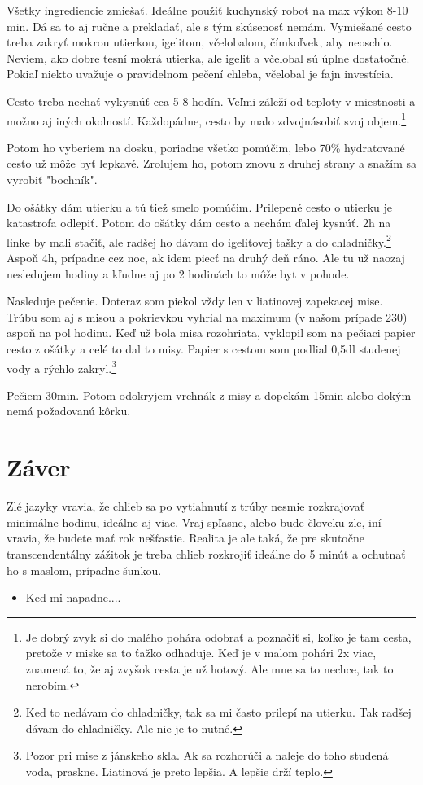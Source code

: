 \documentclass[a4paper,12pt]{article}
\begin{document}
Všetky ingrediencie zmiešať. Ideálne použiť kuchynský robot na max výkon 8-10 min. Dá sa to aj ručne a prekladať, ale s tým skúsenosť nemám. Vymiešané cesto treba zakryť mokrou utierkou, igelitom, včelobalom, čímkoľvek, aby neoschlo. Neviem, ako dobre tesní mokrá utierka, ale igelit a včelobal sú úplne dostatočné. Pokiaľ niekto uvažuje o pravidelnom pečení chleba, včelobal je fajn investícia.

Cesto treba nechať vykysnúť cca 5-8 hodín. Veľmi záleží od teploty v miestnosti a možno aj iných okolností. Každopádne, cesto by malo zdvojnásobiť svoj objem.\footnote{Je dobrý zvyk si do malého pohára odobrať a poznačiť si, koľko je tam cesta, pretože v miske sa to ťažko odhaduje. Keď je v malom pohári 2x viac, znamená to, že aj zvyšok cesta je už hotový. Ale mne sa to nechce, tak to nerobím.}

Potom ho vyberiem na dosku, poriadne všetko pomúčim, lebo 70\% hydratované cesto už môže byť lepkavé. Zrolujem ho, potom znovu z druhej strany a snažím sa vyrobiť "bochník".

Do ošátky dám utierku a tú tiež smelo pomúčim. Prilepené cesto o utierku je katastrofa odlepiť. Potom do ošátky dám cesto a nechám ďalej kysnúť. 2h na linke by mali stačiť, ale radšej ho dávam do igelitovej tašky a do chladničky.\footnote{Keď to nedávam do chladničky, tak sa mi často prilepí na utierku. Tak radšej dávam do chladničky. Ale nie je to nutné.} Aspoň 4h, prípadne cez noc, ak idem piecť na druhý deň ráno. Ale tu už naozaj nesledujem hodiny a kľudne aj po 2 hodinách to môže byt v pohode.

Nasleduje pečenie. Doteraz som piekol vždy len v liatinovej zapekacej mise. Trúbu som aj s misou a pokrievkou vyhrial na maximum (v našom prípade 230) aspoň na pol hodinu. Keď už bola misa rozohriata, vyklopil som na pečiaci papier cesto z ošátky a celé to dal to misy. Papier s cestom som podlial 0,5dl studenej vody a rýchlo zakryl.\footnote{Pozor pri mise z jánskeho skla. Ak sa rozhorúči a naleje do toho studená voda, praskne. Liatinová je preto lepšia. A lepšie drží teplo.}

Pečiem 30min. Potom odokryjem vrchnák z misy a dopekám 15min alebo dokým nemá požadovanú kôrku.


\section{Záver}
Zlé jazyky vravia, že chlieb sa po vytiahnutí z trúby nesmie rozkrajovať minimálne hodinu, ideálne aj viac. Vraj spľasne, alebo bude človeku zle, iní vravia, že budete mať rok nešťastie. Realita je ale taká, že pre skutočne transcendentálny zážitok je treba chlieb rozkrojiť ideálne do 5 minút a ochutnať ho s maslom, prípadne šunkou.

\begin{tcolorbox}[colframe=green!50!black, colback=green!5!white, title=Tipy na Pečenie]
    \begin{itemize}
        \item Ked mi napadne....
    \end{itemize}
\end{tcolorbox}
\end{document}
